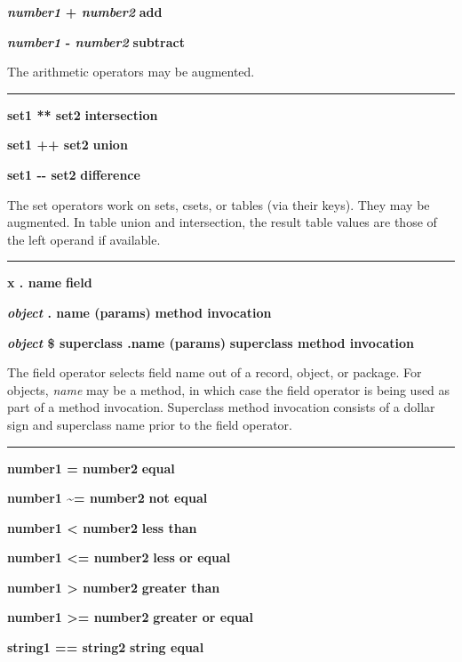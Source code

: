 \noindent
{\bf \textit{number1} + \textit{number2} } \hfill {\bf add}

\noindent
{\bf \textit{number1} - \textit{number2} } \hfill {\bf subtract}

\noindent
The arithmetic operators may be augmented.

\bigskip\hrule\vspace{0.1cm}
\noindent
{\bf set1 ** set2 } \hfill {\bf intersection}

\noindent
{\bf set1 ++ set2 } \hfill {\bf union}

\noindent
{\bf set1 -{}- set2 } \hfill {\bf difference}

\noindent
The set operators work on sets, csets, or tables (via their keys).
They may be augmented. In table union and intersection, the result
table values are those of the left operand if available.

\bigskip\hrule\vspace{0.1cm}

\noindent
{\bf x . name } \hfill {\bf field}

\noindent
{\bf \textit{object} . name (params) } \hfill {\bf method invocation}

\noindent
{\bf \textit{object} \$ superclass .name (params) } \hfill {\bf superclass method invocation}

\noindent
The field operator selects field name out of a record,
object, or package. For objects, \textit{name} may be a method, in
which case the field operator is being used as part of a method
invocation. Superclass method invocation consists of a dollar sign and
superclass name prior to the field operator.

\bigskip\hrule\vspace{0.1cm}
\noindent
{\bf number1 = number2 } \hfill {\bf equal}

\noindent
{}
{\bf number1 \~{}= number2 } \hfill {\bf not equal}

\noindent
{\bf number1 {\textless} number2 } \hfill {\bf less than}

\noindent
{\bf number1 {\textless}= number2 } \hfill {\bf less or equal}

\noindent
{\bf number1 {\textgreater} number2 } \hfill {\bf greater than}

\noindent
{\bf number1 {\textgreater}= number2 } \hfill {\bf greater or equal}

\noindent
{\bf string1 == string2 } \hfill {\bf string equal}

